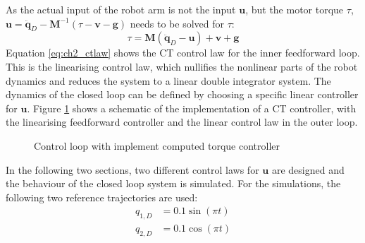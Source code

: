 As the actual input of the robot arm is not the input $\mathbf{u}$, but the motor torque $\tau$, $\mathbf{u} = \ddot{\mathbf{q}}_D - \mathbf{M}^{-1}\left(\tau - \mathbf{v} - \mathbf{g}\right)$ needs to be solved for $\tau$:
\begin{equation}
	\tau = \mathbf{M}(\ddot{\mathbf{q}}_D - \mathbf{u}) + \mathbf{v} + \mathbf{g}
	\label{eq:ch2_ctlaw}
\end{equation}
Equation \ref{eq:ch2_ctlaw} shows the \ac{CT} control law for the inner feedforward loop. This is the linearising control law, which nullifies the nonlinear parts of the robot dynamics and reduces the system to a linear double integrator system. The dynamics of the closed loop can be defined by choosing a specific linear controller for $\mathbf{u}$. Figure \ref{fig:ch2_control_loop} shows a schematic of the implementation of a \ac{CT} controller, with the linearising feedforward controller and the linear control law in the outer loop.
\begin{figure}[H]
	\centering
	
	\caption{Control loop with implement computed torque controller}
	\label{fig:ch2_control_loop}
\end{figure}
In the following two sections, two different control laws for $\mathbf{u}$ are designed and the behaviour of the closed loop system is simulated. For the simulations, the following two reference trajectories are used:
\begin{align*}
	q_{1,D} &= 0.1 \sin(\pi t)\\
	q_{2,D} &= 0.1 \cos(\pi t)
\end{align*}

